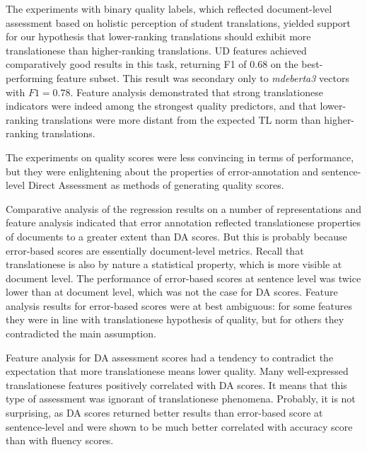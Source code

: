 The experiments with binary quality labels, which reflected document-level assessment based on holistic perception of student translations, yielded support for our hypothesis that lower-ranking translations should exhibit more translationese than higher-ranking translations. UD features achieved comparatively good results in this task, returning F1 of 0.68 on the best-performing feature subset. This result was secondary only to \textit{mdeberta3} vectors with $F1=0.78$. Feature analysis demonstrated that strong translationese indicators were indeed among the strongest quality predictors, and that lower-ranking translations were more distant from the expected TL norm than higher-ranking translations. 

The experiments on quality scores were less convincing in terms of performance, but they were enlightening about the properties of error-annotation and sentence-level Direct Assessment as methods of generating quality scores. 

Comparative analysis of the regression results on a number of representations and feature analysis indicated that error annotation reflected translationese properties of documents to a greater extent than DA scores. But this is probably because error-based scores are essentially document-level metrics. Recall that translationese is also by nature a statistical property, which is more visible at document level. The performance of error-based scores at sentence level was twice lower than at document level, which was not the case for DA scores. 
Feature analysis results for error-based scores were at best ambiguous: for some features they were in line with translationese hypothesis of quality, but for others they contradicted the main assumption. 

Feature analysis for DA assessment scores had a tendency to contradict the expectation that more translationese means lower quality. Many well-expressed translationese features positively correlated with DA scores. It means that this type of assessment was ignorant of translationese phenomena. Probably, it is not surprising, as DA scores returned better results than error-based score at sentence-level and were shown to be much better correlated with accuracy score than with fluency scores.

